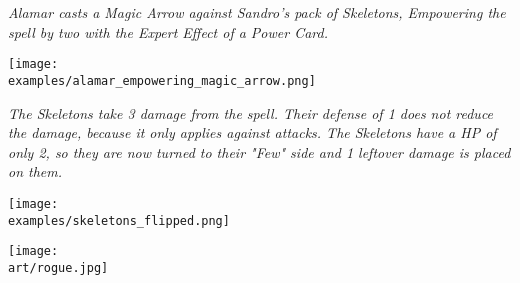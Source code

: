 \begin{multicols}{2}

\textit{Alamar casts a Magic Arrow against Sandro's pack of Skeletons, Empowering  the spell by two with the Expert  Effect  of a Power Card.}

\texttt{[image: \\examples/alamar\_empowering\_magic\_arrow.png]}
\par
\textit{
  The Skeletons take 3 damage  from the spell.
  Their defense  of 1 does not reduce the damage, because it only applies against attacks.
  The Skeletons have a HP  of only 2, so they are now turned to their "Few" side and 1 leftover damage  is placed on them.
}
\par
\texttt{[image: \\examples/skeletons\_flipped.png]}

\texttt{[image: \\art/rogue.jpg]}

\end{multicols}
